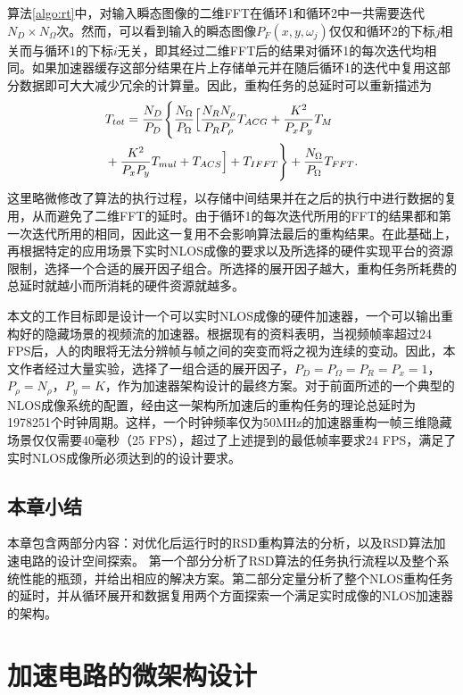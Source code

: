 \documentclass[master]{shtthesis}             %
\begin{document}
算法\ref{algo:rt}中，对输入瞬态图像的二维FFT在循环1和循环2中一共需要迭代$N_D\times N_\Omega$次。然而，可以看到输入的瞬态图像$P_F(x,y,\omega_j)$仅仅和循环2的下标$j$相关而与循环1的下标$i$无关，即其经过二维FFT后的结果对循环1的每次迭代均相同。如果加速器缓存这部分结果在片上存储单元并在随后循环1的迭代中复用这部分数据即可大大减少冗余的计算量。因此，重构任务的总延时可以重新描述为
\begin{equation}
    \begin{split}
        &T_{tot} = \frac{N_D}{P_D} \Biggl\{ \frac{N_{\Omega}}{P_{\Omega}} \Bigl[ \frac{N_{ {R}}N_{\rho}}{P_{ {R}}P_{\rho}} T_{ACG}+\frac{K^2}{P_xP_y}T_M \\ &+ \frac{K^2}{P_xP_y}T_{mul}+T_{ACS} \Bigr] + T_{IFFT}\Biggr\} + \frac{N_{\Omega}}{P_{\Omega}} T_{FFT}. \label{eq:tt}
    \end{split}
\end{equation}
这里略微修改了算法的执行过程，以存储中间结果并在之后的执行中进行数据的复用，从而避免了二维FFT的延时。由于循环1的每次迭代所用的FFT的结果都和第一次迭代所用的相同，因此这一复用不会影响算法最后的重构结果。在此基础上，再根据特定的应用场景下实时NLOS成像的要求以及所选择的硬件实现平台的资源限制，选择一个合适的展开因子组合。所选择的展开因子越大，重构任务所耗费的总延时就越小而所消耗的硬件资源就越多。

本文的工作目标即是设计一个可以实时NLOS成像的硬件加速器，一个可以输出重构好的隐藏场景的视频流的加速器。根据现有的资料表明，当视频帧率超过24 FPS后，人的肉眼将无法分辨帧与帧之间的突变而将之视为连续的变动\citep{read2000restoration}。因此，本文作者经过大量实验，选择了一组合适的展开因子，$P_D=P_\Omega=P_R=P_x=1$，$P_\rho=N_\rho$，$P_y=K$，作为加速器架构设计的最终方案。对于前面所述的一个典型的NLOS成像系统的配置，经由这一架构所加速后的重构任务的理论总延时为1978251个时钟周期。这样，一个时钟频率仅为50MHz的加速器重构一帧三维隐藏场景仅仅需要40毫秒（25 FPS），超过了上述提到的最低帧率要求24 FPS，满足了实时NLOS成像所必须达到的的设计要求。

\section{本章小结}

本章包含两部分内容：对优化后运行时的RSD重构算法的分析，以及RSD算法加速电路的设计空间探索。
第一个部分分析了RSD算法的任务执行流程以及整个系统性能的瓶颈，并给出相应的解决方案。第二部分定量分析了整个NLOS重构任务的延时，并从循环展开和数据复用两个方面探索一个满足实时成像的NLOS加速器的架构。

\chapter{加速电路的微架构设计}
\end{document}
